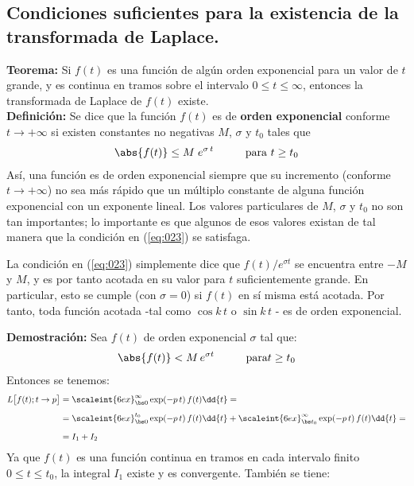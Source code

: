 \subsection{Condiciones suficientes para la existencia de la transformada de Laplace.}

\noindent \textbf{Teorema: } Si $f(t)$ es una función de algún orden exponencial para un valor de $t$ grande, y es continua en tramos sobre el intervalo $0 \leq t \leq \infty$, entonces la transformada de Laplace de $f(t)$ existe.
\\[0.5em]
\textbf{Definición: } Se dice que la función $f(t)$ es de \textbf{orden exponencial} conforme $t \to + \infty$ si existen constantes no negativas $M$, $\sigma$ y $t_{0}$ tales que
\begin{align}
\abs{f(t)} \leq M \; e^{\sigma \, t} \hspace{1cm} \mbox{para } t \geq t_{0}
\label{eq:023}
\end{align}
Así, una función es de orden exponencial siempre que su incremento (conforme $t \to + \infty$) no sea más rápido que un múltiplo constante de alguna función exponencial con un exponente lineal. Los valores particulares de $M$, $\sigma$ y $t_{0}$ no son tan importantes; lo importante es que algunos de esos valores existan de tal manera que la condición en (\ref{eq:023}) se satisfaga.
\par
La condición en (\ref{eq:023}) simplemente dice que $f(t) / e^{\sigma t}$ se encuentra entre $-M$ y $M$, y es por tanto acotada en su valor para $t$ suficientemente grande. En particular, esto se cumple (con $\sigma = 0$) si $f(t)$ en sí misma está acotada. Por tanto, toda función acotada -tal como $\cos k \, t$ o $\sin k \, t$ - es de orden exponencial.
\par
\noindent \textbf{Demostración: } Sea $f(t)$ de orden exponencial $\sigma$ tal que:
\begin{align*}
\abs{f(t)} < M \, e^{\sigma t} \hspace{1cm} \mbox{para} t \geq t_{0}
\end{align*}
Entonces se tenemos:
\begin{align*}
L \big[f(t); t \to p\big] &= \scaleint{6ex}_{\bs 0}^{\infty} \exp(-p \, t) \, f(t) \dd{t} = \\[0.5em]
&= \scaleint{6ex}_{\bs 0}^{t_{0}} \exp(-p \, t) \, f(t) \dd{t} + \scaleint{6ex}_{\bs t_{0}}^{\infty} \exp(-p \, t) \, f(t) \dd{t} = \\[0.5em]
&= I_{1} + I_{2}
\end{align*}
Ya que $f(t)$ es una función continua en tramos en cada intervalo finito $0 \leq t \leq t_{0}$, la integral $I_{1}$ existe y es convergente. También se tiene:
